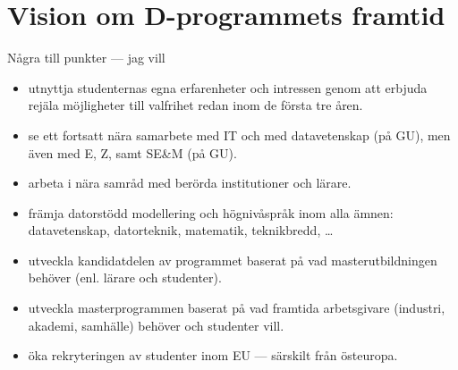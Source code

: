 \section{Vision om D-program\-mets framtid}

% 
% 
% 

Några till punkter --- jag vill
\begin{itemize}
\item utnyttja studenternas egna erfarenheter och intressen genom att
  erbjuda rejäla möjligheter till valfrihet redan inom de första tre
  åren.
\item se ett fortsatt nära samarbete med IT och med datavetenskap (på
  GU), men även med E, Z, samt SE\&M (på GU).
\item arbeta i nära samråd med berörda institutioner och lärare.
\item främja datorstödd modellering och högnivåspråk inom alla ämnen:
  datavetenskap, datorteknik, mate\-matik, teknikbredd, \ldots
\item utveckla kandidatdelen av programmet baserat på vad
  masterutbildningen behöver (enl. lärare och studenter).
\item utveckla masterprogrammen baserat på vad framtida arbetsgivare
  (industri, akademi, samhälle) behöver och studenter vill.
\item öka rekryteringen av studenter inom EU --- särskilt från
  östeuropa.
\end{itemize}
